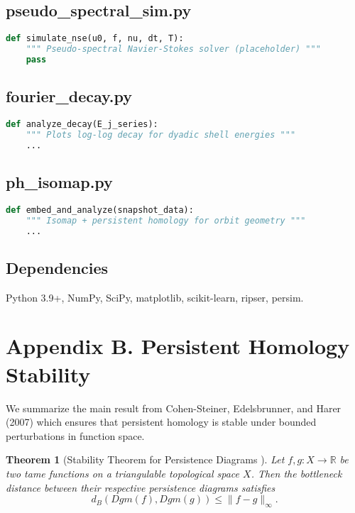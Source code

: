 \documentclass[11pt]{article}
\newtheorem{theorem}{Theorem}[section]
\theoremstyle{definition}
\begin{document}
\subsection*{pseudo\_spectral\_sim.py}
\begin{lstlisting}[language=Python]
def simulate_nse(u0, f, nu, dt, T):
    """ Pseudo-spectral Navier-Stokes solver (placeholder) """
    pass
\end{lstlisting}

\subsection*{fourier\_decay.py}
\begin{lstlisting}[language=Python]
def analyze_decay(E_j_series):
    """ Plots log-log decay for dyadic shell energies """
    ...
\end{lstlisting}

\subsection*{ph\_isomap.py}
\begin{lstlisting}[language=Python]
def embed_and_analyze(snapshot_data):
    """ Isomap + persistent homology for orbit geometry """
    ...
\end{lstlisting}

\subsection*{Dependencies}
Python 3.9+, NumPy, SciPy, matplotlib, scikit-learn, ripser, persim.

\section{Appendix B. Persistent Homology Stability}
\label{sec:appendixB}

We summarize the main result from Cohen-Steiner, Edelsbrunner, and Harer (2007) which ensures that persistent homology is stable under bounded perturbations in function space.

\begin{theorem}[Stability Theorem for Persistence Diagrams \cite{CohenSteiner2007}]
Let $f, g : X \to \mathbb{R}$ be two tame functions on a triangulable topological space $X$. Then the bottleneck distance between their respective persistence diagrams satisfies
\[
d_B(Dgm(f), Dgm(g)) \le \|f - g\|_\infty.
\]
\end{theorem}
\end{document}
